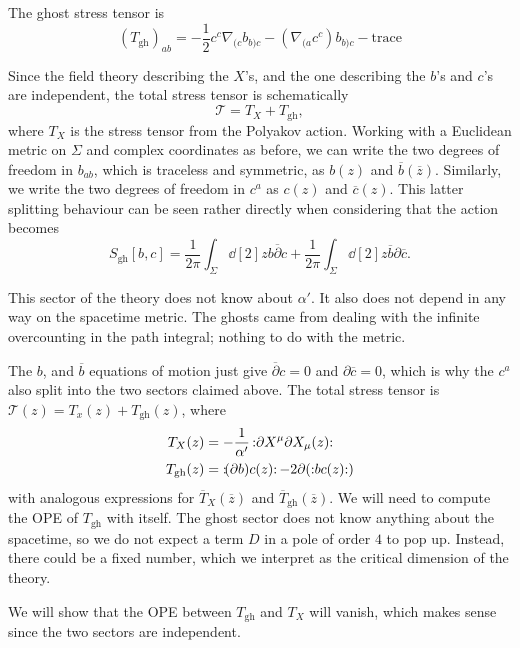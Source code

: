 \begin{claim}
  The ghost stress tensor is
  \begin{equation}
    (T_{\text{gh}})_{ab} = -\frac{1}{2} c^{c} \nabla_{(c} b_{b) c} - (\nabla_{(a} c^{c}) b_{b) c} - \text{trace}
  \end{equation}
\end{claim}
Since the field theory describing the $X$'s, and the one describing the $b$'s and $c$'s are independent, the total stress tensor is schematically
\begin{equation}
  \mathcal{T} = T_X + T_{\text{gh}},
\end{equation}
where $T_X$ is the stress tensor from the Polyakov action.
Working with a Euclidean metric on $\Sigma$ and complex coordinates as before, we can write the two degrees of freedom in $b_{ab}$, which is traceless and symmetric, as $b(z)$ and $\overline{b}{}(\overline{z}{})$.
Similarly, we write the two degrees of freedom in $c^{a}$ as $c(z)$ and $\overline{c}{}(z)$.
This latter splitting behaviour can be seen rather directly when considering that the action becomes
\begin{equation}
  S_{\text{gh}}[b, c] = \frac{1}{2 \pi} \int_\Sigma \dd[2]{z} b \overline{\partial}{} c + \frac{1}{2\pi} \int_\Sigma \dd[2]{z} \overline{b}{} \partial \overline{c}{}.
\end{equation}
\begin{remark}
  This sector of the theory does not know about $\alpha'$.
  It also does not depend in any way on the spacetime metric.
  The ghosts came from dealing with the infinite overcounting in the path integral; nothing to do with the metric.
\end{remark}
The $b$, and $\overline{b}{}$ equations of motion just give $\overline{\partial}{} c = 0$ and $\partial \overline{c}{} = 0$, which is why the $c^{a}$ also split into the two sectors claimed above.
The total stress tensor is $\mathcal{T}(z) = T_x(z) + T_{\text{gh}}(z)$, where
\begin{align}
  T_X(z) &= -\frac{1}{\alpha'} \mathop{:}\nolimits\!\partial X^{\mu} \partial X_{\mu} (z)\!\mathop{:}\nolimits \\
  T_{\text{gh}}(z) &= \mathop{:}\nolimits\!(\partial b) c(z)\!\mathop{:}\nolimits - 2 \partial (\mathop{:}\nolimits\!b c(z)\!\mathop{:}\nolimits)
\end{align}
with analogous expressions for $\overline{T}{}_X (\overline{z}{})$ and $\overline{T}{}_{\text{gh}}(\overline{z}{})$.
We will need to compute the OPE of $T_{\text{gh}}$ with itself.
The ghost sector does not know anything about the spacetime, so we do not expect a term $D$ in a pole of order $4$ to pop up. Instead, there could be a fixed number, which we interpret as the critical dimension of the theory.
\begin{remark}
  We will show that the OPE between $T_{\text{gh}}$ and $T_X$ will vanish, which makes sense since the two sectors are independent.
\end{remark}

